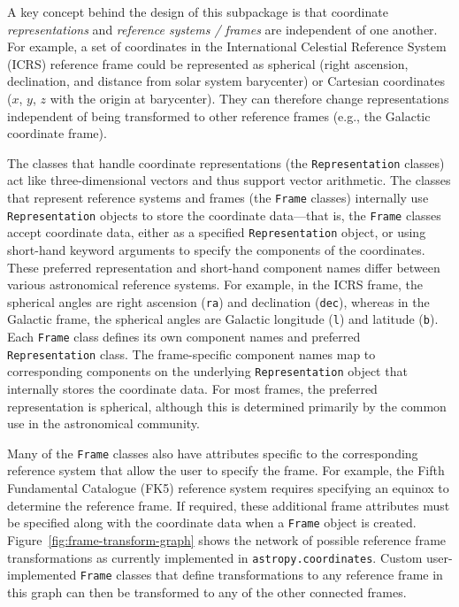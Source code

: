 \documentclass[modern]{aastex62}
\renewcommand{\figurename}{Figure\xspace}
\begin{document}
A key concept behind the design of this subpackage is that coordinate
\textit{representations} and \textit{reference systems / frames} are independent
of one another.
For example, a set of coordinates in the International Celestial Reference
System (ICRS) reference frame could be represented as spherical (right
ascension, declination, and distance from solar system barycenter) or Cartesian
coordinates ($x$, $y$, $z$ with the origin at barycenter).
They can therefore change representations independent of being transformed to
other reference frames (e.g., the Galactic coordinate frame).

The classes that handle coordinate representations (the \texttt{Representation}
classes) act like three-dimensional vectors and thus support vector arithmetic.
The classes that represent reference systems and frames (the \texttt{Frame}
classes) internally use \texttt{Representation} objects to store the coordinate
data---that is, the \texttt{Frame} classes accept coordinate data, either as a
specified \texttt{Representation} object, or using short-hand keyword arguments
to specify the components of the coordinates.
These preferred representation and short-hand component names differ between
various astronomical reference systems.
For example, in the ICRS frame, the spherical angles are right ascension
(\texttt{ra}) and declination (\texttt{dec}), whereas in the Galactic frame, the
spherical angles are Galactic longitude (\texttt{l}) and latitude (\texttt{b}).
Each \texttt{Frame} class defines its own component names and preferred \texttt{Representation} class.
The frame-specific component names map to corresponding components on the
underlying \texttt{Representation} object that internally stores the coordinate
data.
For most frames, the preferred representation is spherical, although this is
determined primarily by the common use in the astronomical community.

Many of the \texttt{Frame} classes also have attributes specific to the
corresponding reference system that allow the user to specify the frame.
For example, the Fifth Fundamental Catalogue (FK5) reference system requires
specifying an equinox to determine the reference frame.
If required, these additional frame attributes must be specified along with the
coordinate data when a \texttt{Frame} object is created.
\figurename~\ref{fig:frame-transform-graph} shows the network of possible
reference frame transformations as currently implemented in
\texttt{astropy.coordinates}.
Custom user-implemented \texttt{Frame} classes that define transformations to
any reference frame in this graph can then be transformed to any of the other
connected frames.
\end{document}
